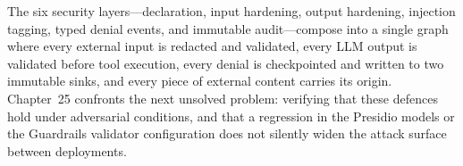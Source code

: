 The six security layers---declaration, input hardening, output
hardening, injection tagging, typed denial events, and immutable
audit---compose into a single graph where every external input is
redacted and validated, every LLM output is validated before tool
execution, every denial is checkpointed and written to two immutable
sinks, and every piece of external content carries its origin. Chapter~25
confronts the next unsolved problem: verifying that these defences
hold under adversarial conditions, and that a regression in the
Presidio models or the Guardrails validator configuration does not
silently widen the attack surface between deployments.
